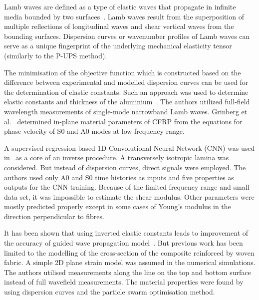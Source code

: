 \documentclass[preprint,12pt]{elsarticle}
\begin{document}
Lamb waves are defined as a type of elastic waves that propagate in infinite media bounded by two surfaces~\cite{Rose1999}. 
Lamb waves result from the superposition of multiple reflections of longitudinal waves and shear vertical waves from the bounding surfaces.
Dispersion curves or wavenumber profiles of Lamb waves can serve as a unique fingerprint of the underlying mechanical elasticity tensor (similarly to the P-UPS method).

The minimisation of the objective function which is constructed based on the difference between experimental and modelled dispersion curves can be used for the determination of elastic constants.
Such an approach was used to determine elastic constants and thickness of the aluminium~\cite{Dean2008}.
The authors utilized full-field wavelength measurements of single-mode narrowband Lamb waves. Grinberg et al.~\cite{Grimberg2010} determined in-plane material parameters of CFRP from the equations for phase velocity of S0 and A0 modes at low-frequency range.

A supervised regression-based 1D-Convolutional Neural Network (CNN) was used in~\cite{Rautela2020} as a core of an inverse procedure.
A transversely isotropic lamina was considered. 
But instead of dispersion curves, direct signals were employed.
The authors used only A0 and S0 time histories as inputs and five properties as outputs for the CNN training.
Because of the limited frequency range and small data set, it was impossible to estimate the shear modulus. 
Other parameters were mostly predicted properly except in some cases of Young's modulus in the direction perpendicular to fibres.

It has been shown that using inverted elastic constants leads to improvement of the accuracy of guided wave propagation model~\cite{Ong2016}.
But previous work has been limited to the modelling of the cross-section of the composite reinforced by woven fabric.
A simple 2D plane strain model was assumed in the numerical simulations.
The authors utilised measurements along the line on the top and bottom surface instead of full wavefield measurements.
The material properties were found by using dispersion curves and the particle swarm optimisation method.
\end{document}
